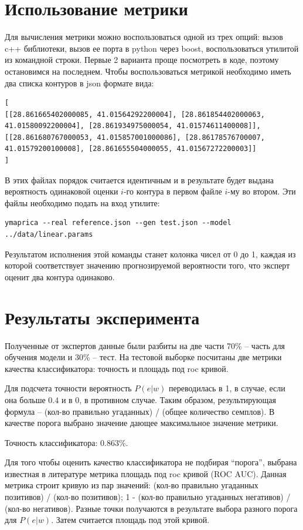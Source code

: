 \documentclass[12pt]{article}
\begin{document}
\section{Использование метрики}
\label{metrica-usage}
Для вычисления метрики можно воспользоваться одной из трех опций: вызов c++ библиотеки, вызов ее порта в python через boost, воспользоваться утилитой из командной строки. Первые 2 варианта проще посмотреть в коде, поэтому остановимся на последнем. Чтобы воспользоваться метрикой необходимо иметь два списка контуров в json формате вида:
{\tiny
\begin{verbatim}
[
[[28.861665402000085, 41.01564292200004], [28.861854402000063, 41.01580092200004], [28.861934975000054, 41.01574611400008]],
[[28.861680767000053, 41.015857001000086], [28.86178576700007, 41.01579200100008], [28.861655504000055, 41.01567272200003]]
]
\end{verbatim}
}
В этих файлах порядок считается идентичным и в результате будет выдана вероятность одинаковой оценки $i$-го контура в первом файле $i$-му во втором. Эти файлы необходимо подать на вход утилите:
{\footnotesize
\begin{verbatim}
ymaprica --real reference.json --gen test.json --model ../data/linear.params
\end{verbatim}}
Результатом исполнения этой команды станет колонка чисел от 0 до 1, каждая из которой соответствует значению прогнозируемой вероятности того, что эксперт оценит два контура одинаково.

\section{Результаты эксперимента}
\label{experiments}
Полученные от экспертов данные были разбиты на две части 70\% -- часть для обучения модели и 30\% -- тест. На тестовой выборке посчитаны две метрики качества классификатора: точность и площадь под roc кривой.

Для подсчета точности вероятность $P(e | w)$ переводилась в 1, в случае, если она больше $0.4$ и в 0, в противном случае. Таким образом, результирующая формула -- (кол-во правильно угаданных) / (общее количество семплов). В качестве порога выбрано значение дающее максимальное значение метрики.

Точность классификатора: 0.863\%.

Для того чтобы оценить качество классификатора не подбирая ``порога'', выбрана известная в литературе метрика площадь под roc кривой (ROC AUC). Данная метрика строит кривую из пар значений: (кол-во правильно угаданных позитивов)  / (кол-во позитивов); 1 - (кол-во правильно угаданных негативов) / (кол-во негативов). Разные точки получаются в результате выбора разного порога для $P(e | w)$. Затем считается площадь под этой кривой.
\end{document}
